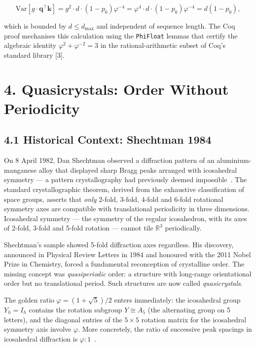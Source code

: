 \[\text{Var}[g \cdot \mathbf{q}^\top \mathbf{k}] = g^2 \cdot d \cdot (1-p_0)\varphi^{-4} = \varphi^4 \cdot d \cdot (1-p_0)\varphi^{-4} = d(1-p_0),\]

which is bounded by \(d \leq d_\text{max}\) and
independent of sequence length. The Coq proof
mechanises this calculation using the
\texttt{PhiFloat} lemmas that certify the
algebraic identity
\(\varphi^2 + \varphi^{-2} = 3\) in the
rational-arithmetic subset of Coq's standard
library [3].


\section{4. Quasicrystals: Order Without
Periodicity}\label{sec:quasicrystals-overview}

\subsection{4.1 Historical Context: Shechtman
1984}\label{sec:shechtman}

On 8 April 1982, Dan Shechtman observed a
diffraction pattern of an aluminium-manganese
alloy that displayed sharp Bragg peaks arranged
with icosahedral symmetry — a pattern
crystallography had previously deemed
impossible~\cite{shechtman1984}. The standard
crystallographic theorem, derived from the
exhaustive classification of space groups, asserts
that \emph{only} 2-fold, 3-fold, 4-fold and 6-fold
rotational symmetry axes are compatible with
translational periodicity in three dimensions.
Icosahedral symmetry — the symmetry of the
regular icosahedron, with its axes of 2-fold,
3-fold and 5-fold rotation — cannot tile
\(\mathbb{R}^3\) periodically.

Shechtman's sample showed 5-fold diffraction
axes regardless. His discovery, announced in
Physical Review Letters in 1984 and honoured with
the 2011 Nobel Prize in Chemistry, forced a
fundamental reconception of crystalline order.
The missing concept was \emph{quasiperiodic}
order: a structure with long-range orientational
order but no translational period. Such structures
are now called \emph{quasicrystals}.

The golden ratio \(\varphi = (1+\sqrt{5})/2\)
enters immediately: the icosahedral group
\(Y_h = I_h\) contains the rotation subgroup
\(Y \cong A_5\) (the alternating group on 5
letters), and the diagonal entries of the
\(5 \times 5\) rotation matrix for the icosahedral
symmetry axis involve \(\varphi\). More
concretely, the ratio of successive peak spacings
in icosahedral diffraction is
\(\varphi : 1\)~\cite{steurer2009quasicrystals}.

